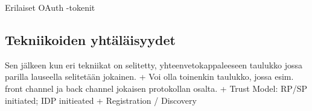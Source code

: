 \documentclass[finnish,gradu]{tktltiki}
\begin{document}
  Erilaiset OAuth -tokenit



  \subsection{Tekniikoiden yhtäläisyydet} %
  \label{sub:tekniikoiden_yhtäläisyydet}

  Sen jälkeen kun eri tekniikat on selitetty, yhteenvetokappaleeseen taulukko jossa parilla lauseella selitetään jokainen.
  + Voi olla toinenkin taulukko, jossa esim. front channel ja back channel jokaisen protokollan osalta.
  + Trust Model: RP/SP initiated; IDP initieated %
  + Registration / Discovery %

\end{document}
